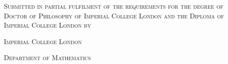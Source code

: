 
\begin{titlepage}

  \renewcommand*{\thepage}{Cover}

  \begin{center}

    \vfill{}

    {\LARGE\textcolor{ImperialBlue}{\textsc{\phdtitle}}\par}

    \vfill{}

    {\large\textsc{Submitted in partial fulfilment of the requirements for the degree of Doctor of Philosophy of Imperial College London and the Diploma of Imperial College London by}\par}

    \vfill{}

    {\Large\textsc{\phdauthor}\par}

    \vfill{}

    \titleornament{}

    \vfill{}

    {\large\textsc{Imperial College London}\par}

    {\large\textsc{Department of Mathematics}\par}

    \vfill{}

    {\large\textsc{\phddate}\par}

  \end{center}

\end{titlepage}

\restoregeometry{}

\setcounter{page}{2}
